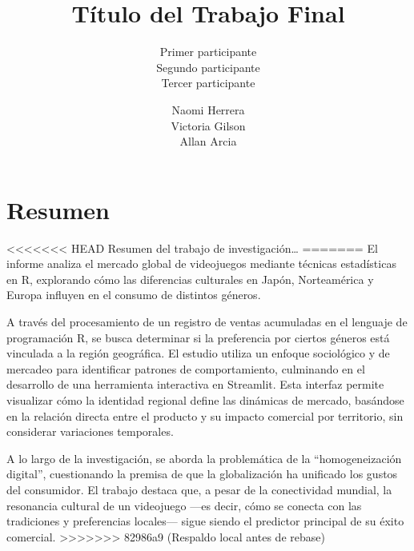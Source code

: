 \documentclass[oneside,11pt]{Latex/Classes/PhDthesisPSnPDF}
\title{Título del Trabajo Final}
\author{Primer participante \\ Segundo participante \\ Tercer
participante}
\author{Naomi Herrera \\ Victoria Gilson \\ Allan Arcia}
\begin{document}
\maketitle

\frontmatter


\setcounter{secnumdepth}{3}
\setcounter{tocdepth}{3}

\tableofcontents



\cleardoublepage

  \cleardoublepage       %
  \chapter*{Resumen}     %
  
<<<<<<< HEAD
  Resumen del trabajo de
investigación\ldots{}             %
=======
  El informe analiza el mercado global de videojuegos mediante técnicas
estadísticas en R, explorando cómo las diferencias culturales en Japón,
Norteamérica y Europa influyen en el consumo de distintos géneros.

A través del procesamiento de un registro de ventas acumuladas en el
lenguaje de programación R, se busca determinar si la preferencia por
ciertos géneros está vinculada a la región geográfica. El estudio
utiliza un enfoque sociológico y de mercadeo para identificar patrones
de comportamiento, culminando en el desarrollo de una herramienta
interactiva en Streamlit. Esta interfaz permite visualizar cómo la
identidad regional define las dinámicas de mercado, basándose en la
relación directa entre el producto y su impacto comercial por
territorio, sin considerar variaciones temporales.

A lo largo de la investigación, se aborda la problemática de la
``homogeneización digital'', cuestionando la premisa de que la
globalización ha unificado los gustos del consumidor. El trabajo destaca
que, a pesar de la conectividad mundial, la resonancia cultural de un
videojuego ---es decir, cómo se conecta con las tradiciones y
preferencias locales--- sigue siendo el predictor principal de su éxito
comercial.             %
>>>>>>> 82986a9 (Respaldo local antes de rebase)
  
\end{document}
